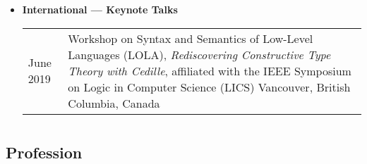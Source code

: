 \documentclass[10pt]{article}
\begin{document}
\begin{itemize}

\item[] \textbf{International --- Keynote Talks}
\\[1.3ex]
\begin{tabular}{l@{\quad\ }p{34em}} 
 June 2019 
 & Workshop on Syntax and Semantics of Low-Level Languages (LOLA),
   \emph{Rediscovering Constructive Type Theory with Cedille},
   affiliated with the IEEE Symposium on Logic in Computer Science (LICS)
   Vancouver, British Columbia, Canada
   \smallskip 
\end{tabular}

\end{itemize}

\pagebreak
\section*{\service}

\subsection*{Profession}

\end{document}
